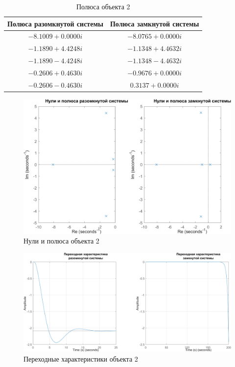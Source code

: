 \begin{table}[H]
    \centering
    \caption{Полюса объекта 2}
    \begin{tabular}{|c|c|}
    \hline
    \textbf{Полюса разомкнутой системы}       & \textbf{Полюса замкнутой системы}        \\ \hline
    $-8.1009 + 0.0000i$      & $-8.0765 + 0.0000i$        \\ \hline
    $-1.1890 + 4.4248i$      & $-1.1348 + 4.4632i$        \\ \hline
    $-1.1890 - 4.4248i$      & $-1.1348 - 4.4632i$        \\ \hline
    $-0.2606 + 0.4630i$      & $-0.9676 + 0.0000i$        \\ \hline
    $-0.2606 - 0.4630i$      & $0.3137 + 0.0000i$         \\ \hline
    \end{tabular}
    \label{tab:poles2}
\end{table}
    

\begin{figure}[H]
    \centering
    \includegraphics[width=\textwidth]{figs/task_1_obj_2_zeros_poles.png}
    \caption{Нули и полюса объекта 2}
    \label{fig:obj2_pz}
\end{figure}

\begin{figure}[H]
    \centering
    \includegraphics[width=\textwidth]{figs/task_1_obj_2_step.png}
    \caption{Переходные характеристики объекта 2}
    \label{fig:obj2_step}
\end{figure}

